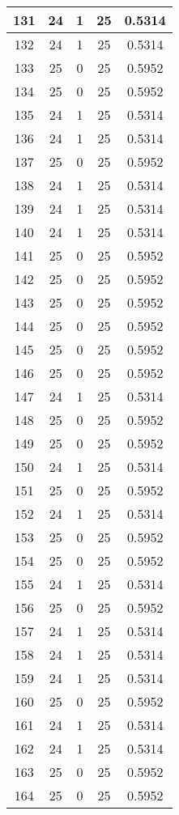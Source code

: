 \documentclass[letterpaper, 12pt]{article}
\begin{document}
\begin{longtable}{|c|c|c|c|c|}
\hline
131 & 24 & 1 & 25 & 0.5314 \\
\hline
132 & 24 & 1 & 25 & 0.5314 \\
\hline
133 & 25 & 0 & 25 & 0.5952 \\
\hline
134 & 25 & 0 & 25 & 0.5952 \\
\hline
135 & 24 & 1 & 25 & 0.5314 \\
\hline
136 & 24 & 1 & 25 & 0.5314 \\
\hline
137 & 25 & 0 & 25 & 0.5952 \\
\hline
138 & 24 & 1 & 25 & 0.5314 \\
\hline
139 & 24 & 1 & 25 & 0.5314 \\
\hline
140 & 24 & 1 & 25 & 0.5314 \\
\hline
141 & 25 & 0 & 25 & 0.5952 \\
\hline
142 & 25 & 0 & 25 & 0.5952 \\
\hline
143 & 25 & 0 & 25 & 0.5952 \\
\hline
144 & 25 & 0 & 25 & 0.5952 \\
\hline
145 & 25 & 0 & 25 & 0.5952 \\
\hline
146 & 25 & 0 & 25 & 0.5952 \\
\hline
147 & 24 & 1 & 25 & 0.5314 \\
\hline
148 & 25 & 0 & 25 & 0.5952 \\
\hline
149 & 25 & 0 & 25 & 0.5952 \\
\hline
150 & 24 & 1 & 25 & 0.5314 \\
\hline
151 & 25 & 0 & 25 & 0.5952 \\
\hline
152 & 24 & 1 & 25 & 0.5314 \\
\hline
153 & 25 & 0 & 25 & 0.5952 \\
\hline
154 & 25 & 0 & 25 & 0.5952 \\
\hline
155 & 24 & 1 & 25 & 0.5314 \\
\hline
156 & 25 & 0 & 25 & 0.5952 \\
\hline
157 & 24 & 1 & 25 & 0.5314 \\
\hline
158 & 24 & 1 & 25 & 0.5314 \\
\hline
159 & 24 & 1 & 25 & 0.5314 \\
\hline
160 & 25 & 0 & 25 & 0.5952 \\
\hline
161 & 24 & 1 & 25 & 0.5314 \\
\hline
162 & 24 & 1 & 25 & 0.5314 \\
\hline
163 & 25 & 0 & 25 & 0.5952 \\
\hline
164 & 25 & 0 & 25 & 0.5952 \\

\end{longtable}
\end{document}
